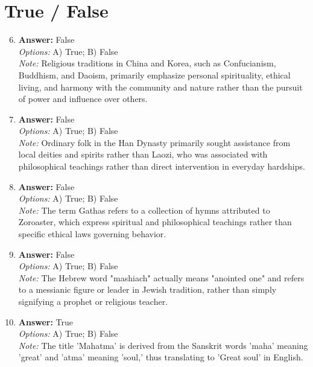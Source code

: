 \documentclass[12pt]{article}
\begin{document}
\section*{True / False}
\begin{enumerate}[label=\arabic*.]
\setcounter{enumi}{5}
\item \textbf{Answer:} False
\\ \textit{Options:} A) True; B) False
\\ \textit{Note:} Religious traditions in China and Korea, such as Confucianism, Buddhism, and Daoism, primarily emphasize personal spirituality, ethical living, and harmony with the community and nature rather than the pursuit of power and influence over others.
\item \textbf{Answer:} False
\\ \textit{Options:} A) True; B) False
\\ \textit{Note:} Ordinary folk in the Han Dynasty primarily sought assistance from local deities and spirits rather than Laozi, who was associated with philosophical teachings rather than direct intervention in everyday hardships.
\item \textbf{Answer:} False
\\ \textit{Options:} A) True; B) False
\\ \textit{Note:} The term Gathas refers to a collection of hymns attributed to Zoroaster, which express spiritual and philosophical teachings rather than specific ethical laws governing behavior.
\item \textbf{Answer:} False
\\ \textit{Options:} A) True; B) False
\\ \textit{Note:} The Hebrew word "mashiach" actually means "anointed one" and refers to a messianic figure or leader in Jewish tradition, rather than simply signifying a prophet or religious teacher.
\item \textbf{Answer:} True
\\ \textit{Options:} A) True; B) False
\\ \textit{Note:} The title 'Mahatma' is derived from the Sanskrit words 'maha' meaning 'great' and 'atma' meaning 'soul,' thus translating to 'Great soul' in English.
\end{enumerate}
\end{document}
